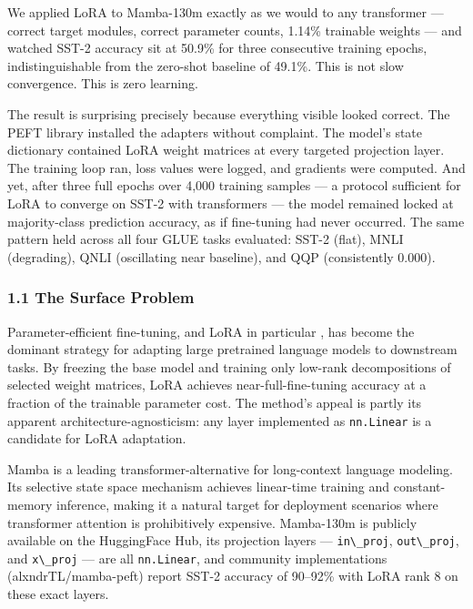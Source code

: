 
We applied LoRA to Mamba-130m exactly as we would to any transformer --- correct target modules, correct parameter counts, 1.14\% trainable weights --- and watched SST-2 accuracy sit at 50.9\% for three consecutive training epochs, indistinguishable from the zero-shot baseline of 49.1\%. This is not slow convergence. This is zero learning.

The result is surprising precisely because everything visible looked correct. The PEFT library installed the adapters without complaint. The model's state dictionary contained LoRA weight matrices at every targeted projection layer. The training loop ran, loss values were logged, and gradients were computed. And yet, after three full epochs over 4,000 training samples --- a protocol sufficient for LoRA to converge on SST-2 with transformers --- the model remained locked at majority-class prediction accuracy, as if fine-tuning had never occurred. The same pattern held across all four GLUE tasks evaluated: SST-2 (flat), MNLI (degrading), QNLI (oscillating near baseline), and QQP (consistently 0.000).

\subsubsection{1.1 The Surface Problem}

Parameter-efficient fine-tuning, and LoRA in particular \citep{Hu2022}, has become the dominant strategy for adapting large pretrained language models to downstream tasks. By freezing the base model and training only low-rank decompositions of selected weight matrices, LoRA achieves near-full-fine-tuning accuracy at a fraction of the trainable parameter cost. The method's appeal is partly its apparent architecture-agnosticism: any layer implemented as \texttt{nn.Linear} is a candidate for LoRA adaptation.

Mamba \citep{Gu2023} is a leading transformer-alternative for long-context language modeling. Its selective state space mechanism achieves linear-time training and constant-memory inference, making it a natural target for deployment scenarios where transformer attention is prohibitively expensive. Mamba-130m is publicly available on the HuggingFace Hub, its projection layers --- \texttt{in\textbackslash \_proj}, \texttt{out\textbackslash \_proj}, and \texttt{x\textbackslash \_proj} --- are all \texttt{nn.Linear}, and community implementations (alxndrTL/mamba-peft) report SST-2 accuracy of 90--92\% with LoRA rank 8 on these exact layers.

